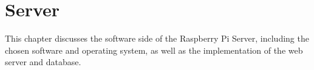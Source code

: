 \chapter{Server}  \label{sec:raspberry_pi}
This chapter discusses the software side of the Raspberry Pi Server,
including the chosen software and operating system, as well 
as the implementation of the web server and database.
    





    
    

    
